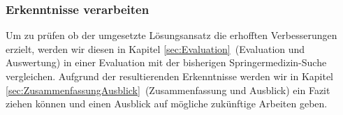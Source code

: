 \subsubsection{Erkenntnisse verarbeiten}
\label{sec:Einfuehrung:GliederungAufbau:Erkenntnisse}

Um zu prüfen ob der umgesetzte Lösungsansatz die erhofften Verbesserungen erzielt, werden wir diesen in Kapitel \ref{sec:Evaluation}~(Evaluation und Auswertung) in einer Evaluation mit der bisherigen Springermedizin-Suche vergleichen. Aufgrund der resultierenden Erkenntnisse werden wir in Kapitel \ref{sec:ZusammenfassungAusblick}~(Zusammenfassung und Ausblick) ein Fazit ziehen können und einen Ausblick auf mögliche zukünftige Arbeiten geben.